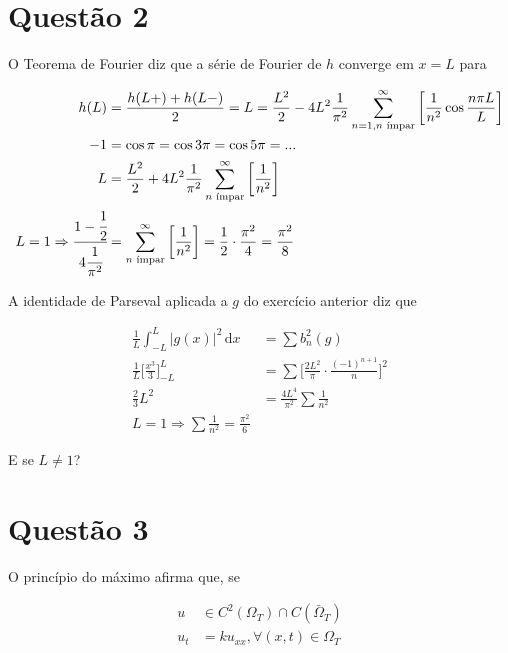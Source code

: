 \documentclass[12pt,a4paper]{article}
\begin{document}
	\section{Quest\~ao 2}
		\begin{flushright}
		\end{flushright}

		O Teorema de Fourier diz que a s\'erie de Fourier de $h$ converge em $x = L$ para

		\begin{align}
			h(L) &= \frac{h(L+) + h(L-)}{2} = L = \frac{L^2}{2} -4 L^2 \frac{1}{\pi^2} \sum_{n = 1, n \text{ \'impar}}^\infty \bigg[ \frac{1}{n^2} \cos \frac{n\pi L}{L} \bigg] \\
			-1 &= \cos \pi = \cos 3\pi = \cos 5\pi = ... \\
			L &= \frac{L^2}{2} +4 L^2 \frac{1}{\pi^2} \sum_{n \text{ \'impar}}^\infty \bigg[ \frac{1}{n^2} \bigg] \\
			L = 1 \Rightarrow \cfrac{1 - \cfrac{1}{2}}{4 \cfrac{1}{\pi^2} } &= \sum_{n \text{ \'impar}}^\infty \bigg[ \frac{1}{n^2} \bigg] = \frac{1}{2} \cdot \frac{\pi^2}{4} = \frac{\pi^2}{8}
		\end{align}

		A identidade de Parseval aplicada a $g$ do exerc\'icio anterior diz que

		\begin{align}
			\frac{1}{L} \int_{-L}^L |g(x)|^2 \,\mathrm{d}x &= \sum b_n^2(g) \\
			\frac{1}{L} \bigg[ \frac{x^3}{3} \bigg]_{-L}^L &= \sum \bigg[\frac{2L^2}{\pi} \cdot \frac{(-1)^{n+1}}{n} \bigg]^2 \\
			\frac{2}{3} L^2 &= \frac{4L^4}{\pi^2} \sum \frac{1}{n^2} \\
			L = 1 \Rightarrow \sum \frac{1}{n^2} = \frac{\pi^2}{6}
		\end{align}

		E se $L \neq 1$?

		\begin{flushright}
		\end{flushright}

	\section{Quest\~ao 3}
		\begin{flushright}
		\end{flushright}

		O princ\'ipio do m\'aximo afirma que, se

		\begin{align}
			u &\in C^2(\Omega_T) \cap C(\bar\Omega_T) \\
			u_t &= k u_{xx}, \forall (x, t) \in \Omega_T
		\end{align}
\end{document}
